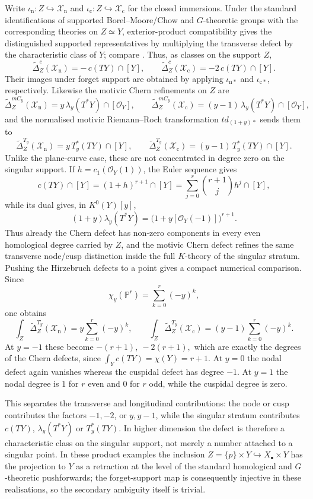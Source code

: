 \documentclass[10pt,a4paper,dvipsnames,x11names]{amsart}
\numberwithin{equation}{section}
\theoremstyle{plain}
\theoremstyle{definition}
\theoremstyle{remark}
\begin{document}
Write $\iota_{\mathrm n}:Z\hookrightarrow\mathcal X_{\mathrm n}$ and $\iota_{\mathrm c}:Z\hookrightarrow\mathcal X_{\mathrm c}$ for the closed immersions.  Under the standard identifications of supported Borel--Moore/Chow and $G$-theoretic groups with the corresponding theories on $Z\simeq Y$, exterior-product compatibility gives the distinguished supported representatives by multiplying the transverse defect by the characteristic class of $Y$; compare \cite{BrasseletSchuermannYokura,MaximSaitoSchuermann}.  Thus, as classes on the support $Z$,
\[
\widetilde\Delta^c_Z(\mathcal X_{\mathrm n})
=
-\,c(TY)\cap[Y],
\qquad
\widetilde\Delta^c_Z(\mathcal X_{\mathrm c})
=
-2\,c(TY)\cap[Y].
\]
Their images under forget support are obtained by applying $\iota_{\mathrm n*}$ and $\iota_{\mathrm c*}$, respectively.  Likewise the motivic Chern refinements on $Z$ are
\[
\widetilde\Delta^{mC_y}_Z(\mathcal X_{\mathrm n})
=
y\,\lambda_y(T^*Y)\cap[\mathcal O_Y],
\qquad
\widetilde\Delta^{mC_y}_Z(\mathcal X_{\mathrm c})
=
(y-1)\,\lambda_y(T^*Y)\cap[\mathcal O_Y],
\]
and the normalised motivic Riemann--Roch transformation $td_{(1+y)*}$ sends them to
\[
\widetilde\Delta^{T_y}_Z(\mathcal X_{\mathrm n})
=
y\,T_y^*(TY)\cap[Y],
\qquad
\widetilde\Delta^{T_y}_Z(\mathcal X_{\mathrm c})
=
(y-1)\,T_y^*(TY)\cap[Y].
\]
Unlike the plane-curve case, these are not concentrated in degree zero on the singular support.  If $h=c_1(\mathcal O_Y(1))$, the Euler sequence gives
\[
c(TY)\cap[Y]
=
(1+h)^{r+1}\cap[Y]
=
\sum_{j=0}^{r}\binom{r+1}{j}h^j\cap[Y],
\]
while its dual gives, in $K^0(Y)[y]$,
\[
(1+y)\lambda_y(T^*Y)
=
\bigl(1+y[\mathcal O_Y(-1)]\bigr)^{r+1}.
\]
Thus already the Chern defect has non-zero components in every even homological degree carried by $Z$, and the motivic Chern defect refines the same transverse node/cusp distinction inside the full $K$-theory of the singular stratum. 
Pushing the Hirzebruch defects to a point gives a compact numerical comparison.  Since
\[
\chi_y(\mathbb P^r)
=
\sum_{k=0}^{r}(-y)^k,
\]
one obtains
\[
\int_Z
\widetilde\Delta^{T_y}_Z(\mathcal X_{\mathrm n})
=
y\sum_{k=0}^{r}(-y)^k,
\qquad
\int_Z
\widetilde\Delta^{T_y}_Z(\mathcal X_{\mathrm c})
=
(y-1)\sum_{k=0}^{r}(-y)^k.
\]
At $y=-1$ these become
$
-(r+1),\ 
-2(r+1),
$
which are exactly the degrees of the Chern defects, since $\int_Y c(TY)=\chi(Y)=r+1$.  At $y=0$ the nodal defect again vanishes whereas the cuspidal defect has degree $-1$.  At $y=1$ the nodal degree is $1$ for $r$ even and $0$ for $r$ odd, while the cuspidal degree is zero.

This separates the transverse and longitudinal contributions: the node or cusp contributes the factors $-1,-2$, or $y,y-1$, while the singular stratum contributes $c(TY)$, $\lambda_y(T^*Y)$ or $T_y^*(TY)$.  In higher dimension the defect is therefore a characteristic class on the singular support, not merely a number attached to a singular point.  In these product examples the inclusion $Z=\{p\}\times Y\hookrightarrow X_{\bullet}\times Y$ has the projection to $Y$ as a retraction at the level of the standard homological and $G$-theoretic pushforwards; the forget-support map is consequently injective in these realisations, so the secondary ambiguity itself is trivial.
\end{document}
